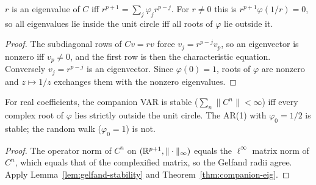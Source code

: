 \begin{theorem}
\label{thm:companion-eig}
\leanok
{}
$r$ is an eigenvalue of $C$ iff $r^{p+1} = \sum_j\varphi_jr^{p-j}$. For $r\ne0$ this is $r^{p+1}\varphi(1/r) = 0$, so all
eigenvalues lie inside the unit circle iff all roots of $\varphi$ lie outside it.
\end{theorem}
\begin{proof}
\leanok
The subdiagonal rows of $Cv = rv$ force $v_j = r^{p-j}v_p$, so an eigenvector is nonzero iff $v_p\ne0$, and the first row
is then the characteristic equation. Conversely $v_j = r^{p-j}$ is an eigenvector. Since $\varphi(0) = 1$, roots of
$\varphi$ are nonzero and $z\mapsto 1/z$ exchanges them with the nonzero eigenvalues.
\end{proof}

\begin{theorem}
\label{thm:arma-stationary}
\leanok
{}
For real coefficients, the companion VAR is stable ($\sum_n\|C^n\| < \infty$) iff every complex root of $\varphi$ lies
strictly outside the unit circle. The AR(1) with $\varphi_0 = 1/2$ is stable; the random walk ($\varphi_0 = 1$) is not.
\end{theorem}
\begin{proof}
\leanok
The operator norm of $C^n$ on $(\mathbb{R}^{p+1},\|\cdot\|_\infty)$ equals the $\ell^\infty$ matrix norm of $C^n$, which equals
that of the complexified matrix, so the Gelfand radii agree. Apply Lemma~\ref{lem:gelfand-stability} and
Theorem~\ref{thm:companion-eig}.
\end{proof}

